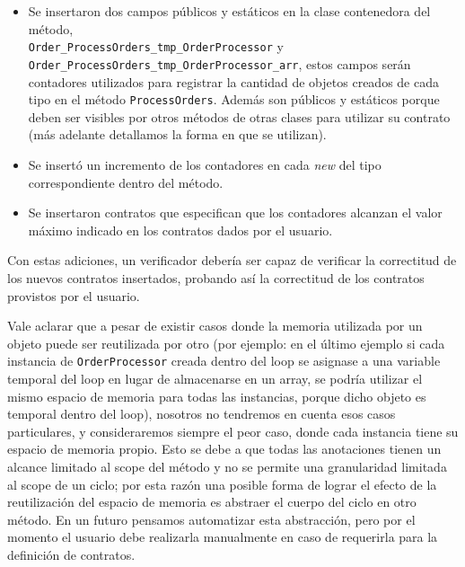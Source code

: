 \documentclass[12pt,a4paper]{article}
\newcommand\mono[1]{\texttt{#1}}
\begin{document}
			\begin{itemize}
				\item Se insertaron dos campos públicos y estáticos en la clase contenedora del método, \\ \mono{Order\_ProcessOrders\_tmp\_OrderProcessor} y \\ \mono{Order\_ProcessOrders\_tmp\_OrderProcessor\_arr}, estos campos serán contadores utilizados para registrar la cantidad de objetos creados de cada tipo en el método \mono{ProcessOrders}. Además son públicos y estáticos porque deben ser visibles por otros métodos de otras clases para utilizar su contrato (más adelante detallamos la forma en que se utilizan).
				\item Se insertó un incremento de los contadores en cada \textit{new} del tipo correspondiente dentro del método.
				\item Se insertaron contratos que especifican que los contadores alcanzan el valor máximo indicado en los contratos dados por el usuario.
			\end{itemize}

			Con estas adiciones, un verificador debería ser capaz de verificar la correctitud de los nuevos contratos insertados, probando así la correctitud de los contratos provistos por el usuario.

			Vale aclarar que a pesar de existir casos donde la memoria utilizada por un objeto puede ser reutilizada por otro (por ejemplo: en el último ejemplo si cada instancia de \mono{OrderProcessor} creada dentro del loop se asignase a una variable temporal del loop en lugar de almacenarse en un array, se podría utilizar el mismo espacio de memoria para todas las instancias, porque dicho objeto es temporal dentro del loop), nosotros no tendremos en cuenta esos casos particulares, y consideraremos siempre el peor caso, donde cada instancia tiene su espacio de memoria propio. Esto se debe a que todas las anotaciones tienen un alcance limitado al scope del método y no se permite una granularidad limitada al scope de un ciclo; por esta razón una posible forma de lograr el efecto de la reutilización del espacio de memoria es abstraer el cuerpo del ciclo en otro método. En un futuro pensamos automatizar esta abstracción, pero por el momento el usuario debe realizarla manualmente en caso de requerirla para la definición de contratos.
\end{document}
